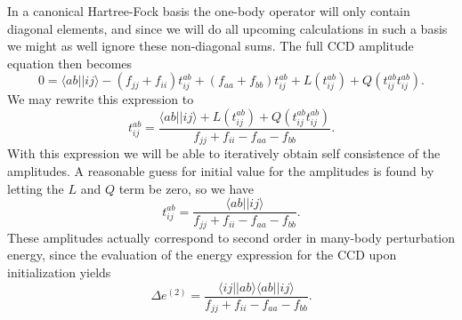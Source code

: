 In a canonical Hartree-Fock basis the one-body operator will only
contain diagonal elements, and since we will do all upcoming
calculations in such a basis we might as well ignore these non-diagonal sums. The full CCD amplitude equation then becomes
\begin{equation}
0 =\langle ab \vert \vert ij \rangle -(f_{jj} + f_{ii}) t_{ij}^{ab}+(f_{aa} + f_{bb}) t_{ij}^{ab}+L(t^{ab}_{ij}) + Q(t^{ab}_{ij}t^{ab}_{ij}).
\end{equation}
We may rewrite this expression to
\begin{equation}
 t_{ij}^{ab} =\frac{\langle ab \vert \vert ij \rangle+L(t^{ab}_{ij}) + Q(t^{ab}_{ij}t^{ab}_{ij})}{f_{jj} + f_{ii} - f_{aa} - f_{bb} }.
\end{equation}
With this expression we will be able to iteratively obtain self
consistence of the amplitudes. A reasonable guess for initial value
for the amplitudes is found by letting the $L$ and $Q$ term be zero,
so we have
\begin{equation}
 t_{ij}^{ab} =\frac{\langle ab \vert \vert ij \rangle}{f_{jj} + f_{ii} - f_{aa} - f_{bb} }.
\label{eqn:initialguess}
\end{equation}
These amplitudes actually correspond to second order in many-body perturbation energy, since
the evaluation of the energy expression for the CCD upon initialization yields
\begin{equation}
\Delta e^{(2)} =\frac{\langle ij \vert \vert ab \rangle \langle ab \vert \vert ij \rangle}{f_{jj} + f_{ii} - f_{aa} - f_{bb} }.
\label{eqn:initialenergy}
\end{equation}


